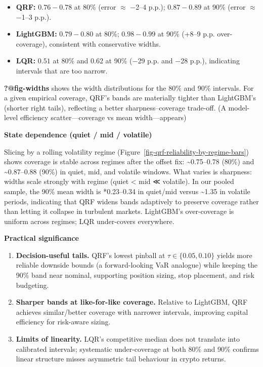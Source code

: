 \documentclass[
  a4paper,
  DIV=11,
  numbers=noendperiod]{scrreprt}
\providecommand{\tightlist}{%
  \setlength{\itemsep}{0pt}\setlength{\parskip}{0pt}}
\begin{document}
\begin{itemize}
\tightlist
\item
  \textbf{QRF:} \(0.76\!\!-\!0.78\) at 80\% (error \(\approx\) −2--4
  p.p.); \(0.87\!\!-\!0.89\) at 90\% (error \(\approx\) −1--3 p.p.).
\item
  \textbf{LightGBM:} \(0.79\!\!-\!0.80\) at 80\%; \(0.98\!\!-\!0.99\) at
  90\% (+8--9 p.p. over-coverage), consistent with conservative widths.
\item
  \textbf{LQR:} \(0.51\) at 80\% and \(0.62\) at 90\% (−29 p.p. and −28
  p.p.), indicating intervals that are too narrow.
\end{itemize}

\textbf{?@fig-widths} shows the width distributions for the 80\% and
90\% intervals. For a given empirical coverage, QRF's bands are
materially tighter than LightGBM's (shorter right tails), reflecting a
better sharpness--coverage trade-off. (A model-level efficiency
scatter---coverage vs mean width---appears)

\textbf{State dependence (quiet / mid / volatile)}

Slicing by a rolling volatility regime
(Figure~\ref{fig-qrf-reliability-by-regime-bars}) shows coverage is
stable across regimes after the offset fix: \textasciitilde0.75--0.78
(80\%) and \textasciitilde0.87--0.88 (90\%) in quiet, mid, and volatile
windows. What varies is sharpness: widths scale strongly with regime
(quiet \textless{} mid ≪ volatile). In our pooled sample, the 90\% mean
width is *0.23--0.34 in quiet/mid versus \textasciitilde1.35 in volatile
periods, indicating that QRF widens bands adaptively to preserve
coverage rather than letting it collapse in turbulent markets.
LightGBM's over-coverage is uniform across regimes; LQR under-covers
everywhere.

\textbf{Practical significance}

\begin{enumerate}
\def\labelenumi{\arabic{enumi}.}
\tightlist
\item
  \textbf{Decision-useful tails.} QRF's lowest pinball at
  \(\tau\in\{0.05,0.10\}\) yields more reliable downside bounds (a
  forward-looking VaR analogue) while keeping the 90\% band near
  nominal, supporting position sizing, stop placement, and risk
  budgeting.
\item
  \textbf{Sharper bands at like-for-like coverage.} Relative to
  LightGBM, QRF achieves similar/better coverage with narrower
  intervals, improving capital efficiency for risk-aware sizing.
\item
  \textbf{Limits of linearity.} LQR's competitive median does not
  translate into calibrated intervals; systematic under-coverage at both
  80\% and 90\% confirms linear structure misses asymmetric tail
  behaviour in crypto returns.
\end{enumerate}
\end{document}
